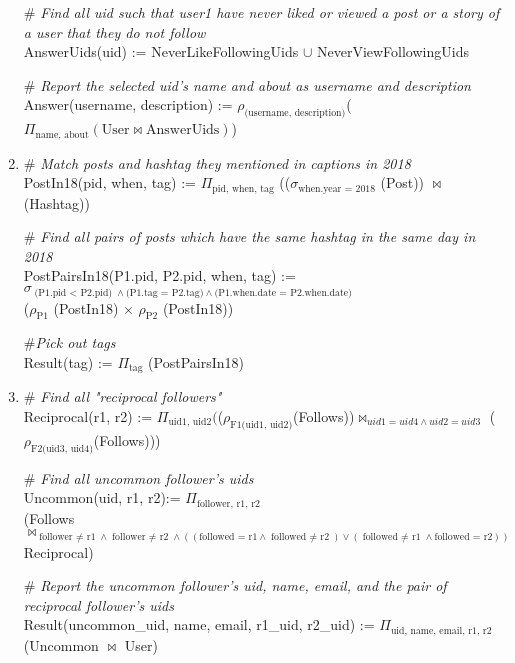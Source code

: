 \documentclass[letter, 9pt]{article}
\begin{document}
\begin{enumerate}
    {\color{gray} \# \textit{Find all uid such that user1 have never liked or viewed a post or a story of a user that they do not follow}\\}
    AnswerUids(uid) := NeverLikeFollowingUids $\cup$ NeverViewFollowingUids 
    
    {\color{gray} \# \textit{Report the selected uid's name and about as username and description} \\}
    Answer(username, description) := $\rho_{\text{(username, description)}}$($\Pi_{\text{name, about}}(\text{User}\bowtie \text{AnswerUids})$)
    
    
    \item {\color{gray} \# \textit{Match posts and hashtag they mentioned in captions in 2018} \\}
    PostIn18(pid, when, tag) := $\Pi_{\text{pid, when, tag}}$
    (($\sigma_{\text{when.year = 2018}}$ (Post)) $\bowtie$ (Hashtag))
    
    {\color{gray} \# \textit{Find all pairs of posts which have the same hashtag in the same day in 2018} \\}
    PostPairsIn18(P1.pid, P2.pid, when, tag) := $\sigma_{\text{(P1.pid $<$ P2.pid)} \land \text{(P1.tag = P2.tag)} \land \text{(P1.when.date = P2.when.date)}}$ \\
    ($\rho_{\text{P1}}$ (PostIn18) $\times$ $\rho_{\text{P2}}$ (PostIn18))
    
    {\color{gray} \#\textit{Pick out tags} \\}
    Result(tag) := $\Pi_{\text{tag}}$ (PostPairsIn18)
    
    \item {\color{gray} \# \textit{Find all "reciprocal followers"}} \\
    Reciprocal(r1, r2) := $\Pi_{\text{uid1, uid2}} ($($\rho_{\text{F1(uid1, uid2)}}$(Follows))$\bowtie_{uid1 = uid4\land uid2 = uid3}$ ($\rho_{\text{F2(uid3, uid4)}}$(Follows)))
    
    {\color{gray} \# \textit{Find all uncommon follower's uids}} \\
    Uncommon(uid, r1, r2):= $\Pi_{\text{follower, r1, r2}}$ \\
    (Follows $\bowtie_{\text{follower $\neq$ r1} \land \text{follower $\neq$ r2} \land 
                      ((\text{followed = r1}\land \text{followed $\neq$ r2}) \lor
                       (\text{followed $\neq$ r1}\land \text{followed = r2}))}$ Reciprocal) 
    
    {\color{gray} \# \textit{Report the uncommon follower's uid, name, email, and the pair of reciprocal follower's uids}} \\
    Result(uncommon\_uid, name, email, r1\_uid, r2\_uid) := $\Pi_{\text{uid, name, email, r1, r2}}$(Uncommon $\bowtie$ User)
    

\end{enumerate}
\end{document}
